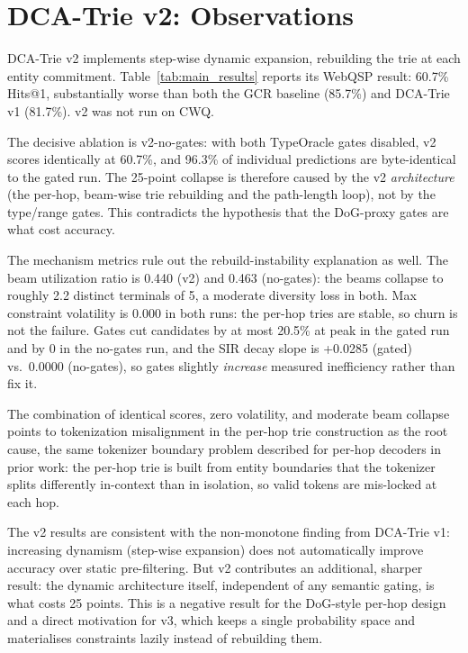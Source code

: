 \section{DCA-Trie v2: Observations}
\label{sec:ch4v2}

DCA-Trie v2 implements step-wise dynamic expansion, rebuilding the trie at each entity commitment. Table~\ref{tab:main_results} reports its WebQSP result: 60.7\% Hits@1, substantially worse than both the GCR baseline (85.7\%) and DCA-Trie v1 (81.7\%). v2 was not run on CWQ.

The decisive ablation is v2-no-gates: with both TypeOracle gates disabled, v2 scores identically at 60.7\%, and 96.3\% of individual predictions are byte-identical to the gated run. The 25-point collapse is therefore caused by the v2 \textit{architecture} (the per-hop, beam-wise trie rebuilding and the path-length loop), not by the type/range gates. This contradicts the hypothesis that the DoG-proxy gates are what cost accuracy.

The mechanism metrics rule out the rebuild-instability explanation as well. The beam utilization ratio is 0.440 (v2) and 0.463 (no-gates): the beams collapse to roughly 2.2 distinct terminals of 5, a moderate diversity loss in both. Max constraint volatility is 0.000 in both runs: the per-hop tries are stable, so churn is not the failure. Gates cut candidates by at most 20.5\% at peak in the gated run and by 0 in the no-gates run, and the SIR decay slope is +0.0285 (gated) vs.\ 0.0000 (no-gates), so gates slightly \textit{increase} measured inefficiency rather than fix it.

The combination of identical scores, zero volatility, and moderate beam collapse points to tokenization misalignment in the per-hop trie construction as the root cause, the same tokenizer boundary problem described for per-hop decoders in prior work: the per-hop trie is built from entity boundaries that the tokenizer splits differently in-context than in isolation, so valid tokens are mis-locked at each hop.

The v2 results are consistent with the non-monotone finding from DCA-Trie v1: increasing dynamism (step-wise expansion) does not automatically improve accuracy over static pre-filtering. But v2 contributes an additional, sharper result: the dynamic architecture itself, independent of any semantic gating, is what costs 25 points. This is a negative result for the DoG-style per-hop design and a direct motivation for v3, which keeps a single probability space and materialises constraints lazily instead of rebuilding them.
